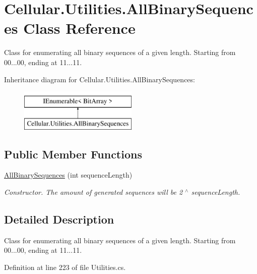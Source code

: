 \hypertarget{class_cellular_1_1_utilities_1_1_all_binary_sequences}{}\section{Cellular.\+Utilities.\+All\+Binary\+Sequences Class Reference}
\label{class_cellular_1_1_utilities_1_1_all_binary_sequences}


Class for enumerating all binary sequences of a given length. Starting from 00...00, ending at 11...11.  


Inheritance diagram for Cellular.\+Utilities.\+All\+Binary\+Sequences\+:\begin{figure}[H]
\begin{center}
\leavevmode
\includegraphics[height=2.000000cm]{class_cellular_1_1_utilities_1_1_all_binary_sequences}
\end{center}
\end{figure}
\subsection*{Public Member Functions}
\begin{DoxyCompactItemize}
\item 
\hyperlink{class_cellular_1_1_utilities_1_1_all_binary_sequences_adb657130e38906af075a17acf6e16364}{All\+Binary\+Sequences} (int sequence\+Length)
\begin{DoxyCompactList}\small\item\em Constructor. The amount of generated sequences will be 2 $^\wedge$ {\ttfamily sequence\+Length}. \end{DoxyCompactList}\end{DoxyCompactItemize}


\subsection{Detailed Description}
Class for enumerating all binary sequences of a given length. Starting from 00...00, ending at 11...11. 



Definition at line 223 of file Utilities.\+cs.




